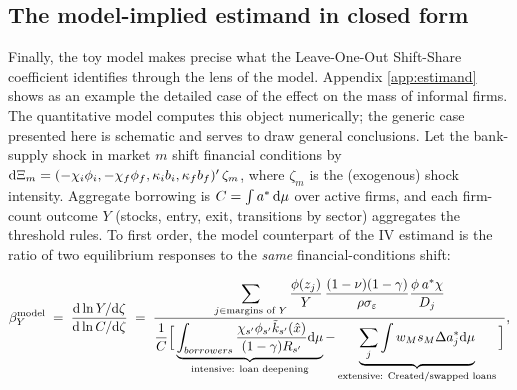 \documentclass[12pt]{article}
\begin{document}
\subsection{The model-implied estimand in closed form}

Finally, the toy model makes precise what the Leave-One-Out Shift-Share
coefficient identifies through the lens of the model. Appendix \ref{app:estimand} shows as an example the detailed case of the effect on the mass of informal firms. The quantitative model computes this object numerically; the generic case presented here is schematic and serves to draw general conclusions. Let the
bank-supply shock in market $m$ shift financial conditions by
$\mathrm{d}\Xi_{m}
=(-\chi_{i}\phi_{i},-\chi_{f}\phi_{f},
\kappa_{i}b_{i},\kappa_{f}b_{f})'\,
\zeta_{m}$, where $\zeta_{m}$ is the (exogenous) shock intensity.
Aggregate borrowing is
$C=\int a^{*}\,\mathrm{d}\mu$ over active firms, and each firm-count outcome
$Y$ (stocks, entry, exit, transitions by sector) aggregates the
threshold rules. To first order, the model counterpart of the IV
estimand is the ratio of two equilibrium responses to the \emph{same}
financial-conditions shift:

\begin{equation}
  \beta_{Y}^{\text{model}}
  \;=\;
  \frac{\mathrm{d}\ln Y/\mathrm{d}\zeta}{\mathrm{d}\ln C/\mathrm{d}\zeta}
  \;=\;
  \frac{\displaystyle\sum_{j\in\text{margins of }Y}
        \frac{\phi(z_{j})}{Y}\,
        \frac{(1-\nu)(1-\gamma)}{\rho\sigma_{\varepsilon}}
        \frac{\phi_{}\,a^{*}\chi}{D_{j}} }
       {\displaystyle \frac{1}{C} \Big[\underbrace{\int_{borrowers}
        \frac{\chi_{s'} \phi_{s'} \tilde{k}_{s'}(\hat{x})}{(1-\gamma)R_{s'}}\mathrm{d}\mu}_{\text{intensive: loan deepening}}
        -\underbrace{\sum_{j} \int w_M s_M \Delta a^{*}_{j} \mathrm{d} \mu }_{\text{extensive: Created/swapped loans}}\Big]} ,
  \label{eq:toy-estimand}
\end{equation}
\end{document}
